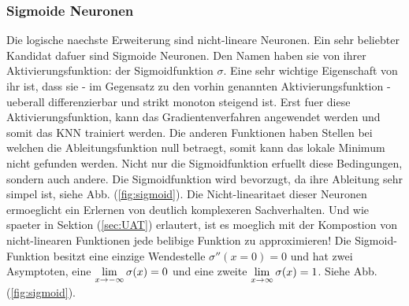 \subsubsection{Sigmoide Neuronen}
Die logische naechste Erweiterung sind nicht-lineare Neuronen.
Ein sehr beliebter Kandidat dafuer sind Sigmoide Neuronen.
Den Namen haben sie von ihrer Aktivierungsfunktion: der Sigmoidfunktion $\sigma$.
Eine sehr wichtige Eigenschaft von ihr ist, dass sie - im Gegensatz zu den vorhin
genannten Aktivierungsfunktion - ueberall differenzierbar und strikt monoton
steigend ist. Erst fuer diese Aktivierungsfunktion, kann das Gradientenverfahren
angewendet werden und somit das KNN trainiert werden. Die anderen
Funktionen haben Stellen bei welchen die Ableitungsfunktion null
betraegt, somit kann das lokale Minimum nicht gefunden werden.
Nicht nur die Sigmoidfunktion erfuellt diese Bedingungen, sondern auch andere. Die Sigmoidfunktion wird
bevorzugt, da ihre Ableitung sehr simpel ist, siehe Abb. (\ref{fig:sigmoid}).
Die Nicht-linearitaet dieser Neuronen ermoeglicht ein Erlernen von deutlich komplexeren Sachverhalten.
Und wie spaeter in Sektion (\ref{sec:UAT}) erlautert, ist es moeglich mit der Kompostion von nicht-linearen
Funktionen jede belibige Funktion zu approximieren!
\para{}
Die Sigmoid-Funktion besitzt eine einzige Wendestelle $\sigma''(x=0)=0$ und hat
zwei Asymptoten, eine $\displaystyle\lim_{x \to -\infty} \sigma(x)=0$
und eine zweite $\displaystyle\lim_{x \to \infty} \sigma(x)=1$. Siehe Abb. (\ref{fig:sigmoid}).


